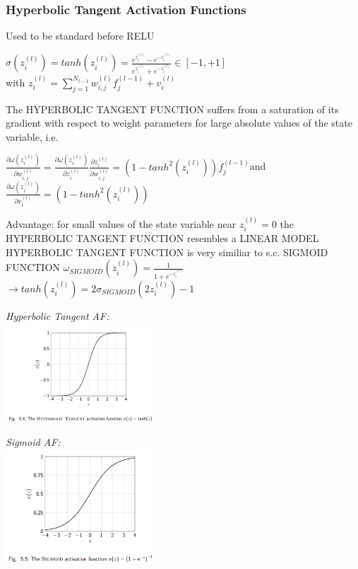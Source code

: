 \begin{sectionbox}
\subsubsection*{Hyperbolic Tangent Activation Functions}
Used to be standard before RELU
\begin{emphbox}
$ \sigma(z_i^{(l)})=tanh(z_i^{(l)})=\frac{e^{z_i^{(l)}}-e^{-z_i^{(l)}}}{e^{z_i^{(l)}}+e^{-z_i^{(l)}}} \in [-1,+1]$\\
with $z_i^{(l)}=\sum_{j=1}^{N_{l-1}}w_{i,j}^{(l)}f_j^{(l-1)}+v_i^{(l)}$
\end{emphbox}
The HYPERBOLIC TANGENT FUNCTION suffers from a saturation of its gradient with respect to weight parameters for large absolute values of the state variable, i.e.
\begin{emphbox}
$\frac{\partial \omega(z_i^{(l)})}{\partial w_{i,j}^{(l)}}=\frac{\partial\omega(z_i^{(l)})}{\partial z_i^{(l)}}\frac{\partial z_i^{(l)}}{\partial w_{i,j}^{(l)}}=(1-tanh^2(z_i^{(l)}))f_j^{(l-1)}$and\\
$\frac{\partial \omega(z_i^{(l)})}{\partial v_{i}^{(l)}}=(1-tanh^2(z_i^{(l)}))$
\end{emphbox}
Advantage: for small values of the state variable near $z_i^{(l)}=0$ the HYPERBOLIC TANGENT FUNCTION resembles a LINEAR MODEL\\

HYPERBOLIC TANGENT FUNCTION is very similiar to s.c. SIGMOID FUNCTION $\omega_{SIGMOID}(z_i^{(l)})=\frac{1}{1+e^{-z_i^{(l)}}}$\\
$\rightarrow tanh(z_i^{(l)})=2\sigma_{SIGMOID}(2z_i^{(l)})-1$\\

\parbox{5.5cm}{\emph{Hyperbolic Tangent AF:}\\ \includegraphics[width = 5.5cm]{./img/hyperbolic_tangent_af}}
\parbox{5.5cm}{\emph{Sigmoid AF:}\\ \includegraphics[width = 5.5cm]{./img/sigmoid_af}}
\end{sectionbox}
